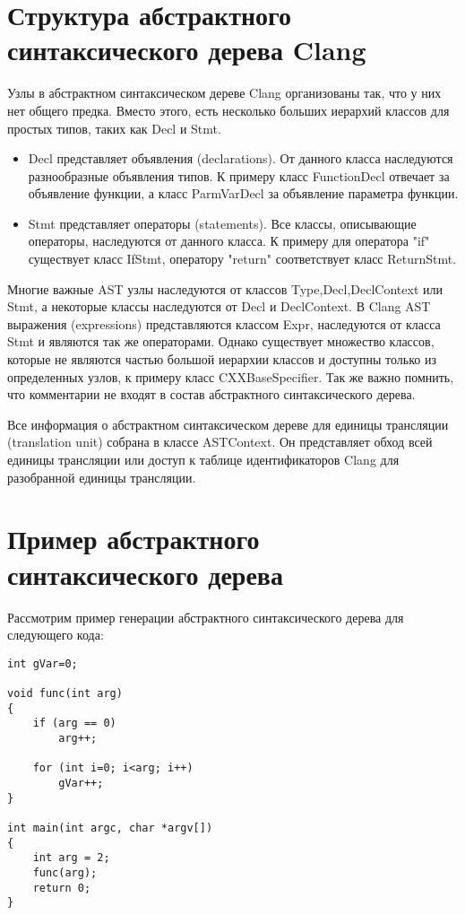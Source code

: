 \section{Структура абстрактного синтаксического дерева Clang}
Узлы в абстрактном синтаксическом дереве Clang организованы так, что у них нет общего предка.
Вместо этого, есть несколько больших иерархий классов для простых типов, таких как Decl и Stmt.
\begin{itemize}
	\item Decl представляет объявления (declarations). От данного класса наследуются разнообразные
объявления типов. К примеру класс FunctionDecl отвечает за объявление функции, а класс ParmVarDecl 
за объявление параметра функции.
	\item Stmt представляет операторы (statements). Все классы, описывающие операторы, наследуются
от данного класса. К примеру для оператора "if" существует класс IfStmt, оператору "return" 
соответствует класс ReturnStmt. 
\end{itemize}
Многие важные AST узлы наследуются от классов Type,Decl,DeclContext или Stmt, а некоторые классы 
наследуются от Decl и DeclContext. В Clang AST выражения (expressions) представляются классом Expr,
наследуются от класса Stmt и являются так же операторами. Однако существует множество классов, 
которые не являются частью большой иерархии классов и доступны только из определенных узлов, 
к примеру класс CXXBaseSpecifier. Так же важно помнить, что комментарии не входят в состав 
абстрактного синтаксического дерева.

Все информация о абстрактном синтаксическом дереве для единицы трансляции (translation unit)
собрана в классе ASTContext. Он представляет обход всей единицы трансляции или доступ к таблице
идентификаторов Clang для разобранной единицы трансляции. 

\section{Пример абстрактного синтаксического дерева}
Рассмотрим пример генерации абстрактного синтаксического дерева для следующего кода:
\begin{lstlisting}
int gVar=0;

void func(int arg)
{
	if (arg == 0)
		arg++;

	for (int i=0; i<arg; i++)
		gVar++;
}

int main(int argc, char *argv[])
{
	int arg = 2;
	func(arg);
	return 0;
}
\end{lstlisting}

